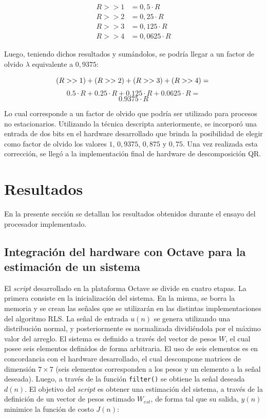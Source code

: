 \begin{align}
R >> 1 &= 0,5    \cdot R \\
R >> 2 &= 0,25   \cdot R \\\nonumber
R >> 3 &= 0,125  \cdot R \\\nonumber
R >> 4 &= 0,0625 \cdot R   \nonumber
\end{align}

Luego, teniendo dichos resultados y sumándolos, se podría llegar a un factor de olvido $\lambda$ equivalente a $0,9375$:

\begin{equation}
(R >> 1) + (R >> 2) + (R >> 3) + (R >> 4) = \\
\end{equation}
\[
0.5 \cdot R + 0.25 \cdot R + 0.125 \cdot R + 0.0625 \cdot R =
\]
\[
0.9375 \cdot R
\]

Lo cual corresponde a un factor de olvido que podría ser utilizado para procesos no estacionarios. Utilizando la técnica descripta anteriormente, se incorporó una entrada de dos bits en el hardware desarrollado que brinda la posibilidad de elegir como factor de olvido los valores $1$, $0,9375$, $0,875$ y $0,75$. Una vez realizada esta corrección, se llegó a la implementación final de hardware de descomposición QR.

\newpage

\section{Resultados}

En la presente sección se detallan los resultados obtenidos durante el ensayo del procesador implementado.

\subsection{Integración del hardware con Octave para la estimación de un sistema}

El \textit{script} desarrollado en la plataforma Octave se divide en cuatro etapas. La primera consiste en la inicialización del sistema. En la misma, se borra la memoria y se crean las señales que se utilizarán en las distintas implementaciones del algoritmo RLS. La señal de entrada $u(n)$ se genera utilizando una distribución normal, y posteriormente es normalizada dividiéndola por el máximo valor del arreglo. El sistema es definido a través del vector de pesos $W$, el cual posee seis elementos definidos de forma arbitraria. El uso de seis elementos es en concordancia con el hardware desarrollado, el cual descompone matrices de dimensión $7 \times 7$ (seis elementos corresponden a los pesos y un elemento a la señal deseada). Luego, a través de la función \verb;filter(); se obtiene la señal deseada $d(n)$. El objetivo del \textit{script} es obtener una estimación del sistema, a través de la definición de un vector de pesos estimado $W_{est}$, de forma tal que su salida, $y(n)$ minimice la función de costo $J(n)$:

